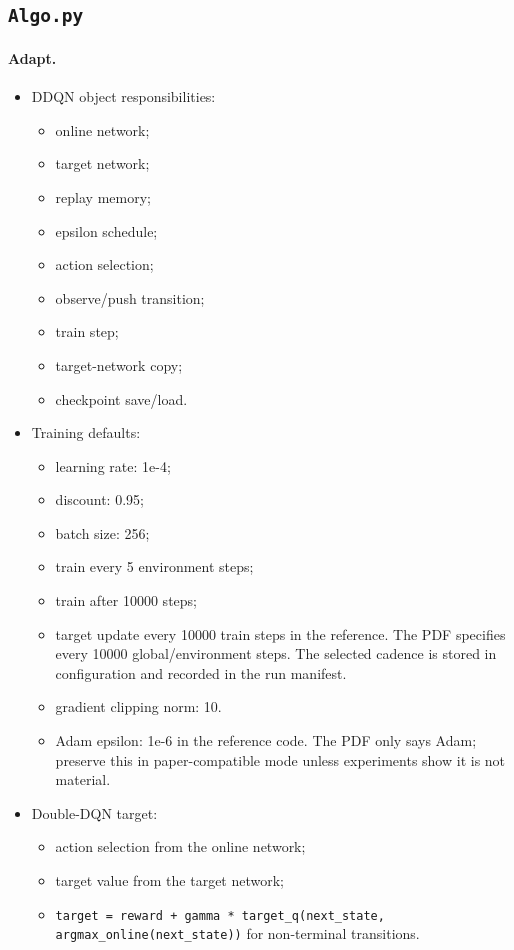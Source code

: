 \documentclass[11pt]{article}
\begin{document}
\subsection{\texttt{Algo.py}}

\paragraph{Adapt.}

\begin{itemize}
\item DDQN object responsibilities:
\begin{itemize}
\item online network;
\item target network;
\item replay memory;
\item epsilon schedule;
\item action selection;
\item observe/push transition;
\item train step;
\item target-network copy;
\item checkpoint save/load.

\end{itemize}
\item Training defaults:
\begin{itemize}
\item learning rate: 1e-4;
\item discount: 0.95;
\item batch size: 256;
\item train every 5 environment steps;
\item train after 10000 steps;
\item target update every 10000 train steps in the reference. The PDF specifies every 10000 global/environment steps. The selected cadence is stored in configuration and recorded in the run manifest.
\item gradient clipping norm: 10.
\item Adam epsilon: 1e-6 in the reference code. The PDF only says Adam; preserve this in paper-compatible mode unless experiments show it is not material.

\end{itemize}
\item Double-DQN target:
\begin{itemize}
\item action selection from the online network;
\item target value from the target network;
\item \texttt{target = reward + gamma * target\_q(next\_state, argmax\_online(next\_state))} for non-terminal transitions.
\end{itemize}
\end{itemize}
\end{document}
